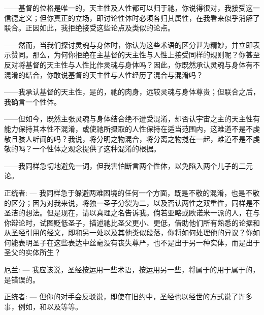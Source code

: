 ——基督的位格是唯一的，天主性及人性都可以归于祂，你说得很对，我接受这一信德定义；但你真正的立场，即讨论性体时必须各归其属性，在我看来似乎消解了联合。正因如此，我拒绝接受这些论点及类似的论点。\par

——然而，当我们探讨灵魂与身体时，你认为这些术语的区分甚为精妙，并立即表示赞同。那么，为何你拒绝在主基督的天主性与人性上接受同样的规则呢？你甚至反对将基督的天主性与人性比作灵魂与身体吗？因此，你既然承认灵魂与身体有不混淆的结合，你敢说基督的天主性与人性经历了混合与混淆吗？\par

——我承认基督的天主性，是的，祂的肉身，远较灵魂与身体尊贵；但联合之后，我确言一个性体。\par

——但如今，既然主张灵魂与身体结合绝不遭受混淆，却否认宇宙之主的天主性有能力保持其本性不混淆，或使祂所摄取的人性保持在适当范围内，这难道不是不虔敬且骇人听闻的吗？我说，将分明之物混合，将分离之物搅在一起，难道不是不虔敬的吗？一个性体之观念提供了这种混淆的根据。\par

——我同样急切地避免一词，但我害怕断言两个性体，以免陷入两个儿子的二元论。\par

正统者: — 我同样急于躲避两难困境的任何一个方面，既是不敬的混淆，也是不敬的区分；因为对我来说，将独一圣子分裂为二，以及否认两性之双重性，同样是不圣洁的想法。但是现在，请以真理之名告诉我。倘若亚略或欧诺米一派的人，在与你辩论时，试图贬低圣子，描述祂比圣父更小、更低，借助他们所有熟悉的论据和从圣经引用的经文，即和另一处以及其他类似段落，你将如何处理他的异议？你如何能表明圣子在这些表达中丝毫没有丧失尊严，也不是出于另一种实体，而是出于圣父的实体所生？\par

厄兰: — 我应该说，圣经按运用一些术语，按运用另一些，将属于的用于属于的，是错误的。\par

正统者: — 但你的对手会反驳说，即使在旧约中，圣经也以经世的方式说了许多事，例如，和以及等等。\par

